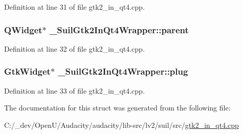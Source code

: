 Definition at line 31 of file gtk2\+\_\+in\+\_\+qt4.\+cpp.

\subsubsection[{\texorpdfstring{parent}{parent}}]{\setlength{\rightskip}{0pt plus 5cm}Q\+Widget$\ast$ \+\_\+\+Suil\+Gtk2\+In\+Qt4\+Wrapper\+::parent}\hypertarget{struct___suil_gtk2_in_qt4_wrapper_a448695a80ce40daba01470f293183ccb}{}\label{struct___suil_gtk2_in_qt4_wrapper_a448695a80ce40daba01470f293183ccb}


Definition at line 32 of file gtk2\+\_\+in\+\_\+qt4.\+cpp.

\subsubsection[{\texorpdfstring{plug}{plug}}]{\setlength{\rightskip}{0pt plus 5cm}Gtk\+Widget$\ast$ \+\_\+\+Suil\+Gtk2\+In\+Qt4\+Wrapper\+::plug}\hypertarget{struct___suil_gtk2_in_qt4_wrapper_aa84bf6ef59c71a1b03bca99ce7a3dac8}{}\label{struct___suil_gtk2_in_qt4_wrapper_aa84bf6ef59c71a1b03bca99ce7a3dac8}


Definition at line 33 of file gtk2\+\_\+in\+\_\+qt4.\+cpp.



The documentation for this struct was generated from the following file\+:\begin{DoxyCompactItemize}
\item 
C\+:/\+\_\+dev/\+Open\+U/\+Audacity/audacity/lib-\/src/lv2/suil/src/\hyperlink{gtk2__in__qt4_8cpp}{gtk2\+\_\+in\+\_\+qt4.\+cpp}\end{DoxyCompactItemize}
